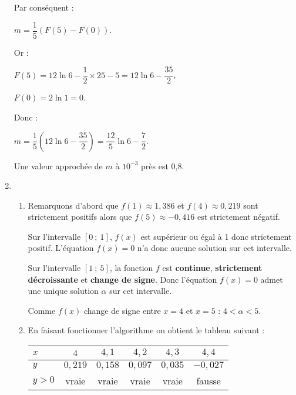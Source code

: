 \begin{corrige}
\begin{enumerate}
          Par conséquent :
          \par
          $m=\dfrac{1}{5}\left(F(5)-F(0)\right)$.
          \par
          Or :
          \par
          $F(5)=12\ln6-\dfrac{1}{2} \times 25 -5 =12\ln6-\dfrac{35}{2}$,
          \par
          $F(0)=2\ln1=0$.
          \par
          Donc :
          \par
          $m=\dfrac{1}{5}\left(12\ln6-\dfrac{35}{2}\right)=\dfrac{12}{5}\ln6-\dfrac{7}{2}$.
          \par
          Une valeur approchée de $m$ à $10^{-3}$ près est 0,8.
          \item %
          \begin{enumerate}[label=\alph*.]
               \item %
               Remarquons d'abord que $f(1) \approx 1,386$ et $f(4) \approx 0,219$ sont strictement positifs alors que $f(5) \approx -0,416$ est strictement négatif.
               \par
               Sur l'intervalle $[0~;~1]$, $f(x)$ est supérieur ou égal à 1 donc strictement positif.
               L'équation $f(x)=0$ n'a donc aucune solution sur cet intervalle.
               \par
               Sur l'intervalle $[1~;~5]$, la fonction $f$ est \textbf{continue}, \textbf{strictement décroissante} et \textbf{change de signe}. Donc l'équation $f(x)=0$ admet une unique solution $\alpha$  sur cet intervalle.
               \par
               Comme $f(x)$ change de signe entre $x=4$ et $x=5$ : ${4 < \alpha < 5}$.
               \item %
               En faisant fonctionner l'algorithme on obtient le tableau suivant :
               \par
               \begin{center}
                    \begin{tabular}{|l|c|c|c|c|c|}\hline %
                         $x$	&$4$	&	 $4,1$  &	 $4,2$ &	 $4,3$ &	 $4,4$ \\ \hline
                         $y$	&$0,219$ &$0,158$	& $0,097$ &$0,035$	&$-0,027$\\ \hline
                         $y > 0$	&vraie	&vraie	&vraie	&vraie	&fausse		\\ \hline
                    \end{tabular}

\end{center}
\end{enumerate}
\end{enumerate}
\end{corrige}
